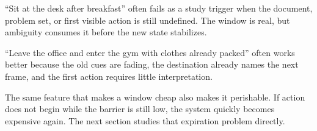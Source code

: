 \begin{example}
``Sit at the desk after breakfast'' often fails as a study trigger when the
document, problem set, or first visible action is still undefined. The window
is real, but ambiguity consumes it before the new state stabilizes.
\end{example}

\begin{example}
``Leave the office and enter the gym with clothes already packed'' often works
better because the old cues are fading, the destination already names the next
frame, and the first action requires little interpretation.
\end{example}

\begin{discussion}
The same feature that makes a window cheap also makes it perishable. If action
does not begin while the barrier is still low, the system quickly becomes
expensive again. The next section studies that expiration problem directly.
\end{discussion}
